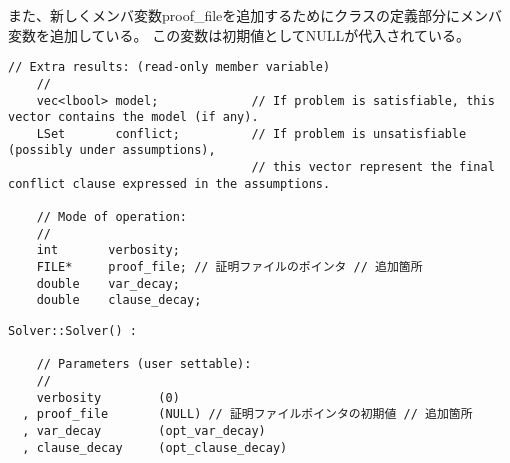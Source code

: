 また、新しくメンバ変数proof\_fileを追加するためにクラスの定義部分にメンバ変数を追加している。
この変数は初期値としてNULLが代入されている。
\begin{lstlisting}[caption=メンバ変数の追加(core/Solver.h), firstnumber=120]
    // Extra results: (read-only member variable)
    //
    vec<lbool> model;             // If problem is satisfiable, this vector contains the model (if any).
    LSet       conflict;          // If problem is unsatisfiable (possibly under assumptions),
                                  // this vector represent the final conflict clause expressed in the assumptions.

    // Mode of operation:
    //
    int       verbosity;
    FILE*     proof_file; // 証明ファイルのポインタ // 追加箇所
    double    var_decay;
    double    clause_decay;
\end{lstlisting}
\begin{lstlisting}[caption=メンバ変数の初期化(core/Solver.cc), firstnumber=54]
    Solver::Solver() :

    // Parameters (user settable):
    //
    verbosity        (0)
  , proof_file       (NULL) // 証明ファイルポインタの初期値 // 追加箇所
  , var_decay        (opt_var_decay)
  , clause_decay     (opt_clause_decay)
\end{lstlisting}